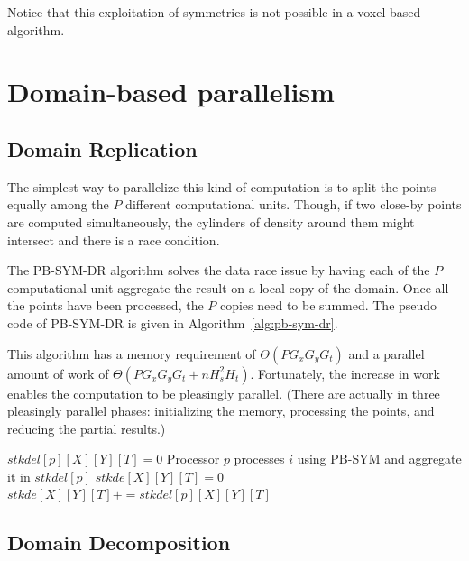 \documentclass[10pt, conference, compsocconf]{IEEEtran}
\begin{document}
Notice that this exploitation of symmetries is not possible in a
voxel-based algorithm.

\label{sec:algo-pb-sym}


\section{Domain-based parallelism}
\label{sec:pb-sym-domain}

\subsection{Domain Replication}

The simplest way to parallelize this kind of computation is to split
the points equally among the $P$ different computational
units. Though, if two close-by points are computed
simultaneously, the cylinders of density around them might intersect and
there is a race condition.

The PB-SYM-DR algorithm solves the data race issue by having each of
the $P$ computational unit aggregate the result on a local copy of the
domain. Once all the points have been processed, the $P$ copies need
to be summed. The pseudo code of PB-SYM-DR is given in
Algorithm~\ref{alg:pb-sym-dr}.

This algorithm has a memory requirement of $\Theta (P  G_x  G_y  G_t)$
and a parallel amount of work of $\Theta (P  G_x  G_y  G_t + n  H_s^2
 H_t)$. Fortunately, the increase in work enables the computation to be
pleasingly parallel. (There are actually in three pleasingly parallel phases:
initializing the memory, processing the points, and reducing the partial results.)

\begin{algorithm}
\caption{\textsc{PB-SYM-DR}}
\scriptsize
\begin{algorithmic}
    \State $stkdel[p][X][Y][T] = 0$
  \EndFor
\EndFor
%
  \State Processor $p$ processes $i$ using PB-SYM and aggregate it in $stkdel[p]$
\EndFor
%
  \State $stkde[X][Y][T] = 0$
    \State $stkde[X][Y][T] += stkdel[p][X][Y][T]$
  \EndFor
\EndFor
\end{algorithmic}
\label{alg:pb-sym-dr}
\end{algorithm}

\subsection{Domain Decomposition}
\label{sec:pb-sym-dd}
\end{document}
